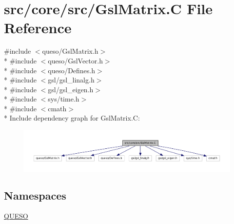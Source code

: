 \hypertarget{_gsl_matrix_8_c}{\section{src/core/src/\-Gsl\-Matrix.C File Reference}
\label{_gsl_matrix_8_c}
}
{\ttfamily \#include $<$queso/\-Gsl\-Matrix.\-h$>$}\\*
{\ttfamily \#include $<$queso/\-Gsl\-Vector.\-h$>$}\\*
{\ttfamily \#include $<$queso/\-Defines.\-h$>$}\\*
{\ttfamily \#include $<$gsl/gsl\-\_\-linalg.\-h$>$}\\*
{\ttfamily \#include $<$gsl/gsl\-\_\-eigen.\-h$>$}\\*
{\ttfamily \#include $<$sys/time.\-h$>$}\\*
{\ttfamily \#include $<$cmath$>$}\\*
Include dependency graph for Gsl\-Matrix.\-C\-:
\nopagebreak
\begin{figure}[H]
\begin{center}
\leavevmode
\includegraphics[width=350pt]{_gsl_matrix_8_c__incl}
\end{center}
\end{figure}
\subsection*{Namespaces}
\begin{DoxyCompactItemize}
\item 
\hyperlink{namespace_q_u_e_s_o}{Q\-U\-E\-S\-O}
\end{DoxyCompactItemize}
